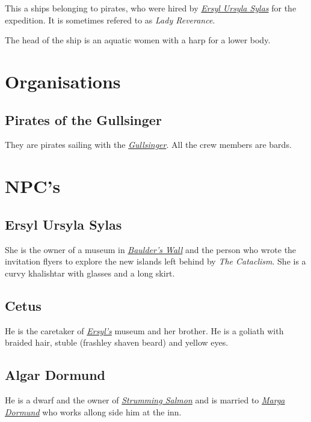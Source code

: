 \documentclass{article}
\begin{document}
\begin{multicols}{2}
    This a ships belonging to pirates, who were hired by \hyperref[ersyl]{\textit{Ersyl Ursyla Sylas}} for the expedition. It is sometimes refered to as \textit{Lady Reverance}.

    The head of the ship is an aquatic women with a harp for a lower body.

    \section{Organisations}
    \label{orgs}

    \subsection{Pirates of the Gullsinger}
    \label{gullsinger_pirates}

    They are pirates sailing with the \hyperref[gullsinger]{\textit{Gullsinger}}. All the crew members are bards.

    \section{NPC's}
    \label{npcs}

    \subsection{Ersyl Ursyla Sylas}
    \label{ersyl}

    She is the owner of a museum in \hyperref[baulders_wall]{\textit{Baulder's Wall}} and the person who wrote the invitation flyers to explore the new islands left behind by \textit{The Cataclism}. She is a curvy khalishtar with glasses and a
    long skirt.

    \subsection{Cetus}
    \label{cetus}

    He is the caretaker of \hyperref[ersyl]{\textit{Ersyl's}} museum and her brother. He is a goliath with braided hair, stuble (frashley shaven beard) and yellow eyes.

    \subsection{Algar Dormund}
    \label{algar}

    He is a dwarf and the owner of \hyperref[strumming_salmon]{\textit{Strumming Salmon}} and is married to \hyperref[marga]{\textit{Marga Dormund}} who works allong side him at the inn.


\end{multicols}
\end{document}

